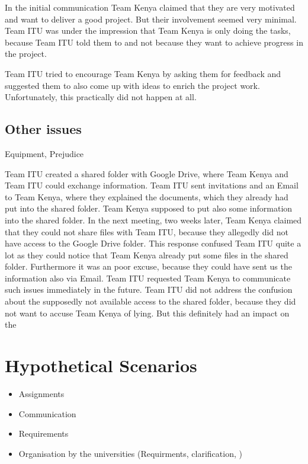 In the initial communication Team Kenya claimed that they are very motivated and want to deliver a good project. But their involvement seemed very minimal. Team ITU was under the impression that Team Kenya is only doing the tasks, because Team ITU told them to and not because they want to achieve progress in the project.

Team ITU tried to encourage Team Kenya by asking them for feedback and suggested them to also come up with ideas to enrich the project work. Unfortunately, this practically did not happen at all.


\subsection{Other issues}
Equipment, Prejudice

Team ITU created a shared folder with Google Drive, where Team Kenya and Team ITU could exchange information. Team ITU sent invitations and an Email to Team Kenya, where they explained the documents, which they already had put into the shared folder. Team Kenya supposed to put also some information into the shared folder. In the next meeting, two weeks later, Team Kenya claimed that they could not share files with Team ITU, because they allegedly did not have access to the Google Drive folder. This response confused Team ITU quite a lot as they could notice that Team Kenya already put some files in the shared folder. Furthermore it was an poor excuse, because they could have sent us the information also via Email.
Team ITU requested Team Kenya to communicate such issues immediately in the future. Team ITU did not address the confusion about the supposedly not available access to the shared folder, because they did not want to accuse Team Kenya of lying. But this definitely had an impact on the


\section{Hypothetical Scenarios}


	\begin{itemize}
		\item Assignments
		\item Communication
		\item Requirements
		\item Organisation by the universities (Requirments, clarification, )
	\end{itemize}
